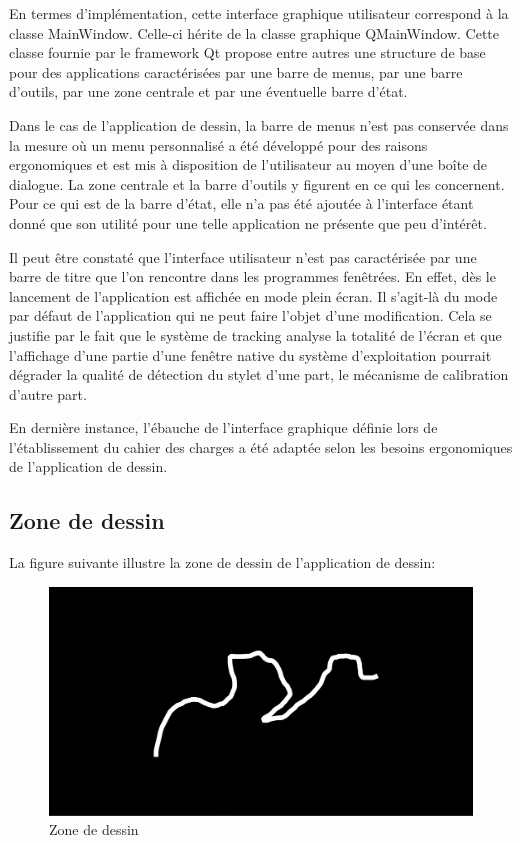 \documentclass[11pt,a4paper,oldfontcommands]{memoir}
\begin{document}
En termes d'implémentation, cette interface graphique utilisateur correspond à la classe MainWindow. Celle-ci hérite de la classe graphique QMainWindow. Cette classe fournie par le framework Qt propose entre autres une structure de base pour des applications caractérisées par une barre de menus, par une barre d'outils, par une zone centrale et par une éventuelle barre d'état. 

Dans le cas de l'application de dessin, la barre de menus n'est pas conservée dans la mesure où un menu personnalisé a été développé pour des raisons ergonomiques et est mis à disposition de l'utilisateur au moyen d'une boîte de dialogue. La zone centrale et la barre d'outils y figurent en ce qui les concernent. Pour ce qui est de la barre d'état, elle n'a pas été ajoutée à l'interface étant donné que son utilité pour une telle application ne présente que peu d'intérêt.

Il peut être constaté que l'interface utilisateur n'est pas caractérisée par une barre de titre que l'on rencontre dans les programmes fenêtrées. En effet, dès le lancement de l'application est affichée en mode plein écran. Il s'agit-là du mode par défaut de l'application qui ne peut faire l'objet d'une modification. Cela se justifie par le fait que le système de tracking analyse la totalité de l'écran et que l'affichage d'une partie d'une fenêtre native du système d'exploitation pourrait dégrader la qualité de détection du stylet d'une part, le mécanisme de calibration d'autre part.

En dernière instance, l'ébauche de l'interface graphique définie lors de l'établissement du cahier des charges a été adaptée selon les besoins ergonomiques de l'application de dessin.

\subsection{Zone de dessin}

La figure suivante illustre la zone de dessin de l'application de dessin:

\begin{figure}[h]
\centering
\includegraphics[scale=0.4]{images/drawing-area.png}
\caption{Zone de dessin}
\end{figure}
\end{document}
